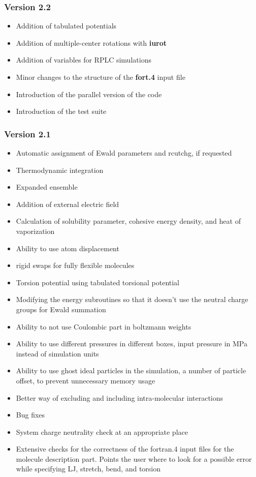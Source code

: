 \documentclass[12pt,letterpaper]{article}
\begin{document}
\subsubsection{Version 2.2}
\begin{itemize}
\item Addition of tabulated potentials
\item Addition of multiple-center rotations with {\bf iurot}
\item Addition of variables for RPLC simulations
\item Minor changes to the structure of the {\bf fort.4}
  input file
\item Introduction of the parallel version of the code
\item Introduction of the test suite
\end{itemize}

\subsubsection{Version 2.1}
\begin{itemize}
\item Automatic assignment of Ewald parameters and rcutchg,
  if requested
\item Thermodynamic integration
\item Expanded ensemble
\item Addition of external electric field
\item Calculation of solubility parameter, cohesive energy
  density, and heat of vaporization
\item Ability to use atom displacement
\item rigid swaps for fully flexible molecules
\item Torsion potential using tabulated torsional potential
\item Modifying the energy subroutines so that it doesn't
  use the neutral charge groups for Ewald summation
\item Ability to not use Coulombic part in boltzmann weights
\item Ability to use different pressures in different boxes,
  input pressure in MPa instead of simulation units
\item Ability to use ghost ideal particles in the
  simulation, a number of particle offset, to prevent
  unnecessary memory usage
\item Better way of excluding and including intra-molecular
  interactions
\item Bug fixes
\item System charge neutrality check at an appropriate place
\item Extensive checks for the correctness of the fortran.4
  input files for the molecule description part. Points the
  user where to look for a possible error while specifying
  LJ, stretch, bend, and torsion
\end{itemize}
\end{document}
